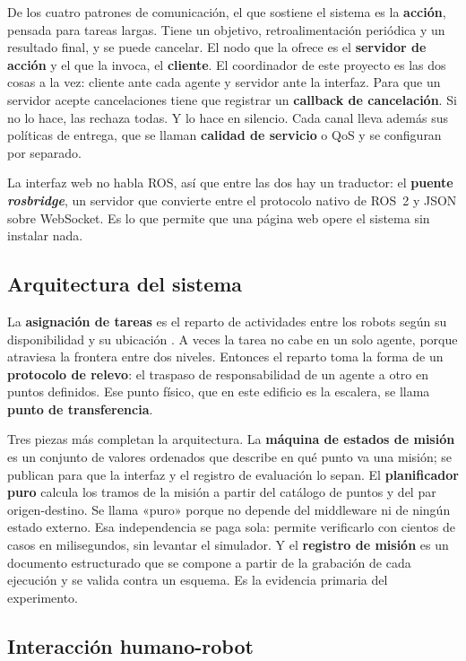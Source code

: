De los cuatro patrones de comunicación, el que sostiene el sistema es la
\textbf{acción}, pensada para tareas largas. Tiene un objetivo, retroalimentación
periódica y un resultado final, y se puede cancelar. El nodo que la ofrece es el
\textbf{servidor de acción} y el que la invoca, el \textbf{cliente}. El
coordinador de este proyecto es las dos cosas a la vez: cliente ante cada agente
y servidor ante la interfaz. Para que un servidor acepte cancelaciones tiene que
registrar un \textbf{callback de cancelación}. Si no lo hace, las rechaza todas.
Y lo hace en silencio. Cada canal lleva además sus políticas de entrega, que se
llaman \textbf{calidad de servicio} o QoS y se configuran por separado.

La interfaz web no habla ROS, así que entre las dos hay un traductor: el
\textbf{puente \textit{rosbridge}}, un servidor que convierte entre el protocolo
nativo de ROS~2 y JSON sobre WebSocket. Es lo que permite que una página web
opere el sistema sin instalar nada.

\subsection{Arquitectura del sistema}

La \textbf{asignación de tareas} es el reparto de actividades entre los robots
según su disponibilidad y su ubicación \autocite{gerkey2004taxonomy}. A veces la
tarea no cabe en un solo agente, porque atraviesa la frontera entre dos niveles.
Entonces el reparto toma la forma de un \textbf{protocolo de relevo}: el traspaso
de responsabilidad de un agente a otro en puntos definidos. Ese punto físico, que en
este edificio es la escalera, se llama \textbf{punto de transferencia}.

Tres piezas más completan la arquitectura. La \textbf{máquina de estados de
misión} es un conjunto de valores ordenados que describe en qué punto va una
misión; se publican para que la interfaz y el registro de evaluación lo sepan. El
\textbf{planificador puro} calcula los tramos de la misión a partir del catálogo
de puntos y del par origen-destino. Se llama «puro» porque no depende del
middleware ni de ningún estado externo. Esa independencia se paga sola: permite
verificarlo con cientos de casos en milisegundos, sin levantar el simulador. Y el
\textbf{registro de misión} es un documento estructurado que se compone a partir
de la grabación de cada ejecución y se valida contra un esquema. Es la evidencia
primaria del experimento.

\subsection{Interacción humano-robot}

